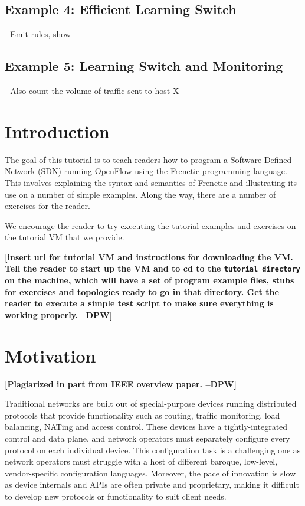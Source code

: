 \documentclass{article}
\newcommand{\finish}[2][cornellred]{\ifdraft\textcolor{#1}{\textbf{[#2]}}\fi}
\newcommand{\dpw}[1]{\finish[cornellred]{#1 --DPW}}
\newcommand{\tutorialdir}{\texttt{tutorial directory}}
\begin{document}
\subsection{Example 4: Efficient Learning Switch}

- Emit rules, show

\subsection{Example 5: Learning Switch and Monitoring}

- Also count the volume of traffic sent to host X

\section{Introduction}

The goal of this tutorial is to teach readers how to program a
Software-Defined Network (SDN) running OpenFlow using the Frenetic
programming language.  This involves explaining the syntax and
semantics of Frenetic and illustrating its use on a number of simple
examples.  Along the way, there are a number of exercises for the
reader.  

We encourage the reader to try executing the tutorial examples and exercises
on the tutorial VM that we provide.

\dpw{insert url for tutorial VM and instructions for downloading the VM.  
Tell the reader to start up the VM and to cd to the \tutorialdir{} on the
machine, which will have a set of program example files, stubs for exercises
and topologies ready to go in that directory.  Get the reader to execute
a simple test script to make sure everything is working properly.}

\section{Motivation}

\dpw{Plagiarized in part from IEEE overview paper.}

Traditional networks are built out of special-purpose devices running
distributed protocols that provide functionality such as routing,
trafﬁc monitoring, load balancing, NATing and access control. These
devices have a tightly-integrated control and data plane, and network
operators must separately conﬁgure every protocol on each individual
device. This configuration task is a challenging one as network
operators must struggle with a host of different baroque, low-level,
vendor-specific configuration languages.  Moreover, the pace of
innovation is slow as device internals and APIs are often private and
proprietary, making it difficult to develop new protocols or
functionality to suit client needs.
\end{document}
